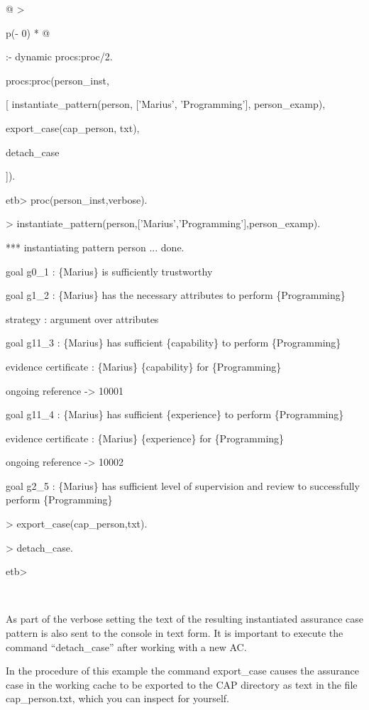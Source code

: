 \documentclass[12pt,twoside,a4paper]{article}
\begin{document}
\begin{longtable}[]{@{}
  >{\raggedright\arraybackslash}p{(\columnwidth - 0\tabcolsep) * }@{}}
\begin{minipage}[b]{\linewidth}
:- dynamic procs:proc/2.

procs:proc(person\_inst,

{[} instantiate\_pattern(person, {[}'Marius', 'Programming'{]}, person\_examp),

export\_case(cap\_person, txt),

detach\_case

{]}).

etb\textgreater{} proc(person\_inst,verbose).

\textgreater{} instantiate\_pattern(person,{[}'Marius','Programming'{]},person\_examp).

*** instantiating pattern person ... done.

goal g0\_1 : \{Marius\} is sufficiently trustworthy

goal g1\_2 : \{Marius\} has the necessary attributes to perform \{Programming\}

strategy : argument over attributes

goal g11\_3 : \{Marius\} has sufficient \{capability\} to perform \{Programming\}

evidence certificate : \{Marius\} \{capability\} for \{Programming\}

ongoing reference -\textgreater{} 10001

goal g11\_4 : \{Marius\} has sufficient \{experience\} to perform \{Programming\}

evidence certificate : \{Marius\} \{experience\} for \{Programming\}

ongoing reference -\textgreater{} 10002

goal g2\_5 : \{Marius\} has sufficient level of supervision and review to successfully perform \{Programming\}

\textgreater{} export\_case(cap\_person,txt).

\textgreater{} detach\_case.

etb\textgreater{}
\end{minipage} \\
\midrule
\endhead
\bottomrule
\end{longtable}

As part of the verbose setting the text of the resulting instantiated assurance case pattern is also sent to the console in text form. It is important to execute the command ``detach\_case'' after working with a new AC.

In the procedure of this example the command export\_case causes the assurance case in the working cache to be exported to the CAP directory as text in the file cap\_person.txt, which you can inspect for yourself.
\end{document}

